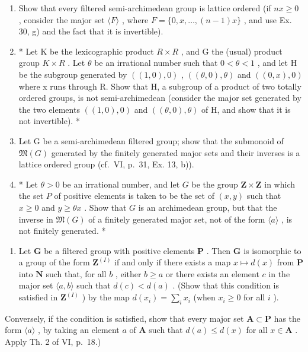 \begin{enumerate}
\def\labelenumi{\alph{enumi})}
\item
  Show that every filtered semi-archimedean group is lattice ordered (if \(nx \geqslant 0\) , consider the major set \(\langle F \rangle\) , where \(F = \{0, x, \ldots, (n - 1)x\}\) , and use Ex. 30, g) and the fact that it is invertible).
\item
  * Let K be the lexicographic product \(R \times R\) , and G the (usual) product group \(K \times R\) . Let \(\theta\) be an irrational number such that \(0 < \theta < 1\) , and let H be the subgroup generated by \(((1, 0), 0)\) , \(((\theta, 0), \theta)\) and \(((0, x), 0)\) where x runs through R. Show that H, a subgroup of a product of two totally ordered groups, is not semi-archimedean (consider the major set generated by the two elements \(((1,0),0)\) and \(((\theta ,0),\theta)\) of H, and show that it is not invertible). *
\item
  Let G be a semi-archimedean filtered group; show that the submonoid of \(\mathfrak{M}(G)\) generated by the finitely generated major sets and their inverses is a lattice ordered group (cf.~VI, p.~31, Ex. 13, b)).
\item
  * Let \(\theta > 0\) be an irrational number, and let \(G\) be the group \(\mathbf{Z} \times \mathbf{Z}\) in which the set \(P\) of positive elements is taken to be the set of \((x, y)\) such that \(x \geqslant 0\) and \(y \geqslant \theta x\) . Show that \(G\) is an archimedean group, but that the inverse in \(\mathfrak{M}(G)\) of a finitely generated major set, not of the form \(\langle a \rangle\) , is not finitely generated. *
\end{enumerate}

\begin{enumerate}
\def\labelenumi{\arabic{enumi})}
\setcounter{enumi}{35}
\tightlist
\item
  Let \(\mathbf{G}\) be a filtered group with positive elements \(\mathbf{P}\) . Then \(\mathbf{G}\) is isomorphic to a group of the form \(\mathbf{Z}^{(I)}\) if and only if there exists a map \(x \mapsto d(x)\) from \(\mathbf{P}\) into \(\mathbf{N}\) such that, for all \(b\) , either \(b \geqslant a\) or there exists an element \(c\) in the major set \(\langle a, b \rangle\) such that \(d(c) < d(a)\) . (Show that this condition is satisfied in \(\mathbf{Z}^{(I)}\) ) by the map \(d(x_{i}) = \sum_{i} x_{i}\) (when \(x_{i} \geqslant 0\) for all \(i\) ).
\end{enumerate}

Conversely, if the condition is satisfied, show that every major set \(\mathbf{A} \subset \mathbf{P}\) has the form \(\langle a \rangle\) , by taking an element \(a\) of \(\mathbf{A}\) such that \(d(a) \leqslant d(x)\) for all \(x \in \mathbf{A}\) . Apply Th. 2 of VI, p.~18.)
